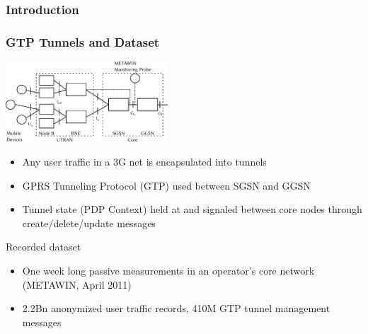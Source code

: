 \documentclass{beamer}
\begin{document}
\begin{frame}
	\frametitle{Introduction}
\end{frame}
\begin{frame}
    \frametitle{GTP Tunnels and Dataset}

      \begin{center}
		\includegraphics[height=3cm]{../../chapters/04-mobilenets/images/umts-network.pdf}
	\end{center}


    \begin{itemize}
		\item Any user traffic in a 3G net is encapsulated into tunnels
		\item GPRS Tunneling Protocol (GTP) used between SGSN and GGSN
		\item Tunnel state (PDP Context) held at and signaled between core nodes through create/delete/update messages
	\end{itemize}
	Recorded dataset
	\begin{itemize}
		\item One week long passive measurements in an operator's core network (METAWIN, April 2011)
		\item 2.2Bn anonymized user traffic records, 410M GTP tunnel management messages
	\end{itemize}
\end{frame}
\end{document}
